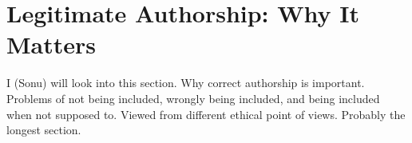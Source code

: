 \section{Legitimate Authorship: Why It Matters}
I (Sonu) will look into this section. Why correct authorship is important. Problems of not being included, wrongly being included, and being included when not supposed to.
Viewed from different ethical point of views.
Probably the longest section.